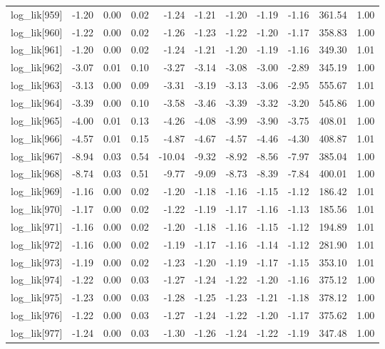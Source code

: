 \begin{table}[ht]
\begin{tabular}{rrrrrrrrrrr}
  log\_lik[959] & -1.20 & 0.00 & 0.02 & -1.24 & -1.21 & -1.20 & -1.19 & -1.16 & 361.54 & 1.00 \\ 
  log\_lik[960] & -1.22 & 0.00 & 0.02 & -1.26 & -1.23 & -1.22 & -1.20 & -1.17 & 358.83 & 1.00 \\ 
  log\_lik[961] & -1.20 & 0.00 & 0.02 & -1.24 & -1.21 & -1.20 & -1.19 & -1.16 & 349.30 & 1.01 \\ 
  log\_lik[962] & -3.07 & 0.01 & 0.10 & -3.27 & -3.14 & -3.08 & -3.00 & -2.89 & 345.19 & 1.00 \\ 
  log\_lik[963] & -3.13 & 0.00 & 0.09 & -3.31 & -3.19 & -3.13 & -3.06 & -2.95 & 555.67 & 1.01 \\ 
  log\_lik[964] & -3.39 & 0.00 & 0.10 & -3.58 & -3.46 & -3.39 & -3.32 & -3.20 & 545.86 & 1.00 \\ 
  log\_lik[965] & -4.00 & 0.01 & 0.13 & -4.26 & -4.08 & -3.99 & -3.90 & -3.75 & 408.01 & 1.00 \\ 
  log\_lik[966] & -4.57 & 0.01 & 0.15 & -4.87 & -4.67 & -4.57 & -4.46 & -4.30 & 408.87 & 1.01 \\ 
  log\_lik[967] & -8.94 & 0.03 & 0.54 & -10.04 & -9.32 & -8.92 & -8.56 & -7.97 & 385.04 & 1.00 \\ 
  log\_lik[968] & -8.74 & 0.03 & 0.51 & -9.77 & -9.09 & -8.73 & -8.39 & -7.84 & 400.01 & 1.00 \\ 
  log\_lik[969] & -1.16 & 0.00 & 0.02 & -1.20 & -1.18 & -1.16 & -1.15 & -1.12 & 186.42 & 1.01 \\ 
  log\_lik[970] & -1.17 & 0.00 & 0.02 & -1.22 & -1.19 & -1.17 & -1.16 & -1.13 & 185.56 & 1.01 \\ 
  log\_lik[971] & -1.16 & 0.00 & 0.02 & -1.20 & -1.18 & -1.16 & -1.15 & -1.12 & 194.89 & 1.01 \\ 
  log\_lik[972] & -1.16 & 0.00 & 0.02 & -1.19 & -1.17 & -1.16 & -1.14 & -1.12 & 281.90 & 1.01 \\ 
  log\_lik[973] & -1.19 & 0.00 & 0.02 & -1.23 & -1.20 & -1.19 & -1.17 & -1.15 & 353.10 & 1.01 \\ 
  log\_lik[974] & -1.22 & 0.00 & 0.03 & -1.27 & -1.24 & -1.22 & -1.20 & -1.16 & 375.12 & 1.00 \\ 
  log\_lik[975] & -1.23 & 0.00 & 0.03 & -1.28 & -1.25 & -1.23 & -1.21 & -1.18 & 378.12 & 1.00 \\ 
  log\_lik[976] & -1.22 & 0.00 & 0.03 & -1.27 & -1.24 & -1.22 & -1.20 & -1.17 & 375.62 & 1.00 \\ 
  log\_lik[977] & -1.24 & 0.00 & 0.03 & -1.30 & -1.26 & -1.24 & -1.22 & -1.19 & 347.48 & 1.00 \\ 

\end{tabular}
\end{table}
